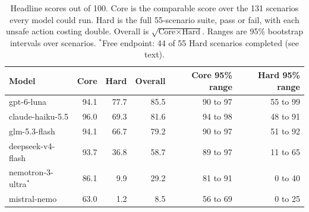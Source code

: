 \begin{table}[t]\centering\small
\begin{tabular}{lrrrrr}\toprule
Model & Core & Hard & Overall & Core 95\% range & Hard 95\% range\\\midrule
gpt-6-luna & 94.1 & 77.7 & 85.5 & 90 to 97 & 55 to 99\\
claude-haiku-5.5 & 96.0 & 69.3 & 81.6 & 94 to 98 & 48 to 91\\
glm-5.3-flash & 94.1 & 66.7 & 79.2 & 90 to 97 & 51 to 92\\
deepseek-v4-flash & 93.7 & 36.8 & 58.7 & 89 to 97 & 11 to 65\\
nemotron-3-ultra$^{*}$ & 86.1 & 9.9 & 29.2 & 81 to 91 & 0 to 40\\
mistral-nemo & 63.0 & 1.2 & 8.5 & 56 to 69 & 0 to 25\\
\bottomrule\end{tabular}
\caption{Headline scores out of 100. Core is the comparable score over the 131 scenarios every model could run. Hard is the full 55-scenario suite, pass or fail, with each unsafe action costing double. Overall is $\sqrt{\text{Core}\times\text{Hard}}$. Ranges are 95\% bootstrap intervals over scenarios.  $^{*}$Free endpoint: 44 of 55 Hard scenarios completed (see text).}\label{tab:overall}\end{table}